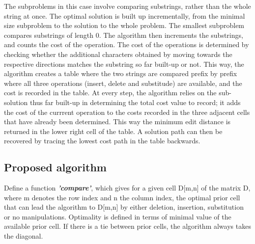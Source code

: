 \documentclass[11pt]{article}
\begin{document}
The subproblems in this case involve comparing substrings, rather than
the whole string at once. The optimal solution is built up
incrementally, from the minimal size subproblem to the solution to the
whole problem. The smallest subproblem compares substrings of length 0.
The algorithm then increments the substrings, and counts the cost of the
operation. The cost of the operations is determined by checking whether
the additional characters obtained by moving towards the respective
directions matches the substring so far built-up or not. This way, the
algorithm creates a table where the two strings are compared prefix by
prefix where all three operations (insert, delete and substitude) are
available, and the cost is recorded in the table. At every step, the
algorithm relies on the sub-solution thus far built-up in determining
the total cost value to record; it adds the cost of the currrent
operation to the costs recorded in the three adjacent cells that have
already been determined. This way the minimum edit distance is returned
in the lower right cell of the table. A solution path can then be
recovered by tracing the lowest cost path in the table backwards.

    \subsection{Proposed algorithm}\label{proposed-algorithm}

Define a function \textbf{\emph{'compare'}}, which gives for a given
cell D{[}m,n{]} of the matrix D, where m denotes the row index and n the
column index, the optimal prior cell that can lead the algorithm to
D{[}m,n{]} by either deletion, insertion, substitution or no
manipulations. Optimality is defined in terms of minimal value of the
available prior cell. If there is a tie between prior cells, the
algorithm always takes the diagonal.
\end{document}
